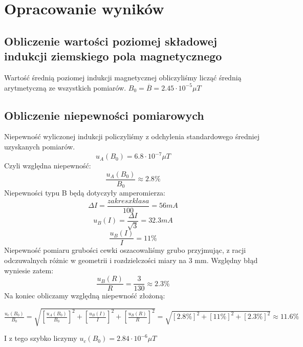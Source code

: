 \documentclass{article}
\begin{document}

\section{Opracowanie wyników}
\subsection{Obliczenie wartości poziomej składowej indukcji ziemskiego pola magnetycznego}
Wartość średnią poziomej indukcji magnetycznej obliczyliśmy licząć średnią arytmetyczną ze wszystkich pomiarów.
$B_0 = \overline{B} = 2.45 \cdot 10^{-5} \mu T$

\subsection{Obliczenie niepewności pomiarowych}
Niepewność wyliczonej indukcji policzyliśmy z odchylenia standardowego średniej uzyskanych pomiarów.
\begin{equation}
u_A(B_0) = 6.8 \cdot 10^{-7} \mu T
\end{equation}
Czyli względna niepewność:
\begin{equation}
\frac{u_A(B_0)}{B_0} \approx 2.8\%
\end{equation}
Niepewności typu B będą dotyczyły amperomierza:
\begin{equation}
\Delta I = \frac{zakres x klasa}{100} = 56 mA
\end{equation}
\begin{equation}
u_B(I) = \frac{\Delta I}{\sqrt{3}} = 32.3 mA 
\end{equation}
\begin{equation}
\frac{u_B(I)}{I} = 11 \%
\end{equation}
Niepewność pomiaru grubości cewki oszacowaliśmy grubo przyjmując, z racji odczuwalnych różnic w geometrii i rozdzielczości miary na 3 mm.
Względny błąd wyniesie zatem:
\begin{equation}
\frac{u_B(R)}{R} = 	\frac{3}{130} \approx 2.3 \%
\end{equation}
Na koniec obliczamy względną niepewność złożoną: \\ \newline
\centerline{$\frac{u_c(B_0)}{B_0} = \sqrt{[\frac{u_A(B_0)}{B_0}]^2 + [\frac{u_B(I)}{I}]^2 + [\frac{u_B(R)}{R}]^2} = \sqrt{[2.8\%]^2+[11\%]^2+[2.3\%]^2} \approx 11.6 \%$}
\newline
\newline
I z tego szybko liczymy $u_c(B_0) = 2.84 \cdot 10^{-6} \mu T$
\end{document}
